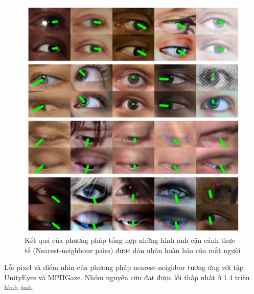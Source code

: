 \begin{center}
    \begin{figure}[h!]
    \begin{center}
     \includegraphics[scale=0.7]{img/The_result_of_Nearest_neighbour_pairs.png}
    \end{center}
    \caption{Kết quả của phương pháp tổng hợp những hình ảnh cận cảnh thực tế (Nearest-neighbour pairs) được dán nhãn hoàn hảo của mắt người }
    \label{refhinh15}
    \end{figure}
\end{center}

Lỗi pixel và điểm nhìn của phương pháp nearest-neighbor tương ứng với tập UnityEyes và MPIIGaze. Nhóm nguyên cứu đạt được lỗi thấp nhất ở 1.4 triệu hình ảnh.


